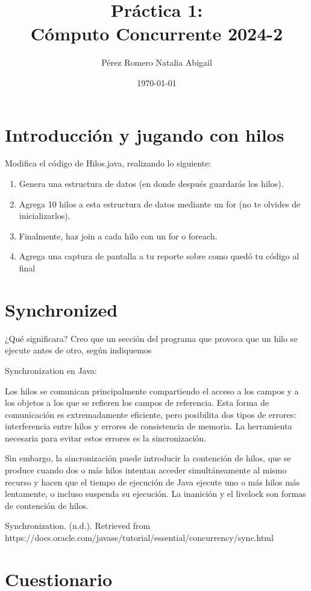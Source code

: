 \documentclass{article}
\title{Práctica 1:  \\ Cómputo Concurrente 2024-2}
\author{Pérez Romero Natalia Abigail}
\date{\today}
\begin{document}
\maketitle

\section{Introducción y jugando con hilos}

Modifica el código de Hilos.java, realizando lo siguiente:
\begin{enumerate}
    \item Genera una estructura de datos (en donde después guardarás los hilos).
    \item Agrega 10 hilos a esta estructura de datos mediante un for (no te olvides de inicializarlos).
    \item Finalmente, haz join a cada hilo con un for o foreach.
    \item Agrega una captura de pantalla a tu reporte sobre como quedó tu código al final
\end{enumerate}

\section{Synchronized}
¿Qué significara? Creo que un sección del programa que provoca que un hilo se ejecute antes de otro, según indiquemos

Synchronization en Java:

Los hilos se comunican principalmente compartiendo el acceso a los campos y a los objetos a los que se refieren los campos de referencia. Esta forma de comunicación es extremadamente eficiente, pero posibilita dos tipos de errores: interferencia entre hilos y errores de consistencia de memoria. La herramienta necesaria para evitar estos errores es la sincronización.

Sin embargo, la sincronización puede introducir la contención de hilos, que se produce cuando dos o más hilos intentan acceder simultáneamente al mismo recurso y hacen que el tiempo de ejecución de Java ejecute uno o más hilos más lentamente, o incluso suspenda su ejecución. La inanición y el livelock son formas de contención de hilos.

Synchronization. (n.d.). Retrieved from https://docs.oracle.com/javase/tutorial/essential/concurrency/sync.html

\section{Cuestionario}
\end{document}
